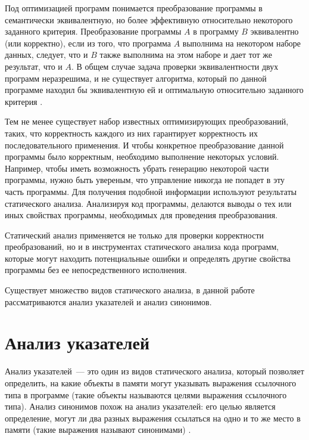 \documentclass[14pt,titlepage]{extarticle}
\let\oldsection\section
\renewcommand{\section}{\newpage\oldsection}
\begin{document}
    Под оптимизацией программ понимается преобразование программы в
    семантически эквивалентную, но более эффективную относительно некоторого
    заданного критерия.
    Преобразование программы $A$ в программу $B$ эквивалентно (или корректно),
    если из того, что программа $A$ выполнима на некотором наборе данных,
    следует, что и $B$ также выполнима на этом наборе и дает тот же результат,
    что и $A$.
    В общем случае задача проверки эквивалентности двух программ неразрешима,
    и не существует алгоритма, который по данной программе находил бы
    эквивалентную ей и оптимальную относительно заданного критерия
    \cite{kasjanov_translators}.

    Тем не менее существует набор известных оптимизирующих преобразований,
    таких, что корректность каждого из них гарантирует корректность их
    последовательного применения.
    И чтобы конкретное преобразование данной программы было корректным,
    необходимо выполнение некоторых условий. Например, чтобы иметь
    возможность убрать генерацию некоторой части программы, нужно быть
    увереным, что управление никогда не попадет в эту часть программы.
    Для получения подобной информации используют результаты статического
    анализа. Анализируя код программы, делаются выводы о тех или иных свойствах
    программы, необходимых для проведения преобразования.

    Статический анализ применяется не только для проверки
    корректности преобразований, но и в инструментах статического анализа
    кода программ, которые могут находить потенциальные ошибки и определять
    другие свойства программы без ее непосредственного исполнения.

    Существует множество видов статического анализа, в данной работе
    рассматриваются анализ указателей и анализ синонимов.

  \section{Анализ указателей}

    Анализ указателей~--- это один из видов статического анализа, который
    позволяет определить, на какие объекты в памяти могут указывать выражения
    ссылочного типа в программе (такие объекты называются целями выражения
    ссылочного типа). Анализ синонимов похож на анализ указателей: его целью
    является определение, могут ли два разных выражения ссылаться на одно и
    то же место в памяти (такие выражения называют синонимами)
    \cite{andersen}.
\end{document}
